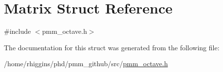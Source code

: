 \hypertarget{structMatrix}{\section{Matrix Struct Reference}
\label{structMatrix}
}


{\ttfamily \#include $<$pmm\-\_\-octave.\-h$>$}



The documentation for this struct was generated from the following file\-:\begin{DoxyCompactItemize}
\item 
/home/rhiggins/phd/pmm\-\_\-github/src/\hyperlink{pmm__octave_8h}{pmm\-\_\-octave.\-h}\end{DoxyCompactItemize}
